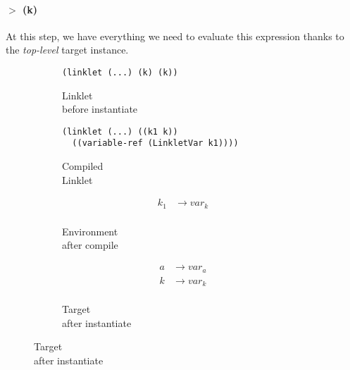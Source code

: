 \paragraph{$>$ (k)}

At this step, we have everything we need to evaluate this expression
thanks to the \emph{top-level} target instance.

\begin{figure}[h!]
  \small
  \begin{subfigure}[b]{0.25\textwidth}
    \begin{mdframed}
\begin{verbatim}
(linklet (...) (k) (k))
\end{verbatim}
    \end{mdframed}
    \caption{Linklet \\ before instantiate}
    \label{fig:1}
  \end{subfigure}
  \begin{subfigure}[b]{0.38\textwidth}
    \begin{mdframed}
\begin{verbatim}
(linklet (...) ((k1 k))
  ((variable-ref (LinkletVar k1))))
\end{verbatim}
    \end{mdframed}
    \caption{Compiled \\ Linklet}
    \label{fig:2}
  \end{subfigure} \hfill
  \begin{subfigure}[b]{0.15\textwidth}
    \begin{mdframed}
      \begin{align*}
        k_1 &\rightarrow var_k \\
      \end{align*}
    \end{mdframed}
    \caption{Environment \\ after compile}
    \label{fig:2}
  \end{subfigure}
  \begin{subfigure}[b]{0.15\textwidth}
    \begin{mdframed}
      \begin{align*}
        a &\rightarrow var_a \\
        k &\rightarrow var_k \\
      \end{align*}
    \end{mdframed}
    \caption{Target \\ after instantiate}
    \label{fig:2}
  \end{subfigure}
\end{figure}

